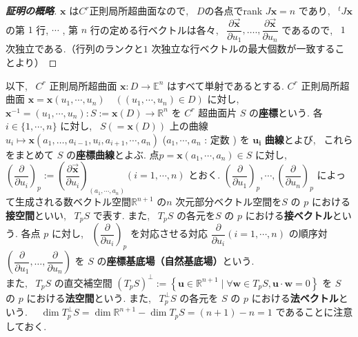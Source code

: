 \documentclass[12pt,a4j,final]{jreport}
\theoremstyle{definition}
\begin{document}
\begin{proof}[\textbf{証明の概略}]
$\boldsymbol{x}$ は$C^r$正則局所超曲面なので, \ $D$の各点でrank $J \boldsymbol{x} = n$ であり, \ ${}^t J \boldsymbol{x}$ の第 $1$ 行, $\cdots$ , 第 $n$ 行の定める行ベクトルは各々, \ $\dfrac{\partial \vec{\boldsymbol{x}}}{\partial u_{1}}, \ldots ., \dfrac{\partial \vec{\boldsymbol{x}}}{\partial u_{n}}$ であるので, \ $1$次独立である.（行列のランクと$1$ 次独立な行ベクトルの最大個数が一致することより）
\end{proof}

\bigskip

以下, \ $C^r$ 正則局所超曲面 $\boldsymbol{x}: D \rightarrow \mathbb{E}^{n}$ はすべて単射であるとする.
$C^{r}$ 正則局所超曲面 $\boldsymbol{x}= \boldsymbol{x} \left(u_{1}, \cdots, u_{n}\right) \quad ((u_{1}, \cdots, u_{n}) \in D )$ に対し,
$\boldsymbol{x}^{-1}=\left(u_{1}, \cdots, u_{n}\right): S:=\boldsymbol{x}(D) \rightarrow \mathbb{R}^{n}$ を $C^{r}$ 超曲面片 $S$ の\textbf{座標}という.
各 $i \in\{1, \cdots, n\}$ に対し, \ $S(= \boldsymbol{x}(D))$ 上の曲線 $u_{i} \mapsto \boldsymbol{x}\left(a_{1}, \ldots, a_{i-1}, u_{i}, a_{i+1}, \cdots, a_{n}\right)$
($a_{1}, \cdots, a_{n}$ : 定数 ) を $\boldsymbol{u_{i}}$ \textbf{曲線}とよび, \ これらをまとめて $S$ の\textbf{座標曲線}とよぶ.
点$p = \boldsymbol{x} (a_{1}, \cdots, a_{n}) \in S$ に対し, 
$\left(\dfrac{\partial}{\partial u_{i}}\right)_{p}:=\left(\dfrac{\partial \vec{\boldsymbol{x}}}{\partial u_{i}}\right)_{\left(a_1, \cdots, a_{n}\right)}(i=1, \cdots, n)$ とおく.
$\left(\dfrac{\partial}{\partial u_{1}}\right)_{p}, \cdots,\left(\dfrac{\partial}{\partial u_{n}}\right)_{p}$ によって生成される数ベクトル空間$\mathbb{R}^{n+1}$ の$n$ 次元部分ベクトル空間を$S$ の $p$ における\textbf{接空間}といい, \ $T_p S$ で表す. また, \ $T_p S$ の各元を$S$ の $p$ における\textbf{接ベクトル}という.
各点 $p$ に対し, \ $\left(\dfrac{\partial}{\partial u_{i}}\right)_{p}$ を対応させる対応 $\dfrac{\partial}{\partial u_{i}}(i=1 , \cdots, n)$ の順序対 $\left(\dfrac{\partial}{\partial u_{1}}, \ldots, \dfrac{\partial}{\partial u_{n}}\right)$ を $S$ の\textbf{座標基底場（自然基底場）}という.\\
また, \ $T_p S$ の直交補空間 $\left(T_{p} S\right)^{\perp}:=\left\{\boldsymbol{u} \in \mathbb{R}^{n+1} \mid \forall \boldsymbol{w} \in T_{p} S, \boldsymbol{u} \cdot \boldsymbol{w} =0\right\}$ を $S$ の $p$ における\textbf{法空間}という. また, \ $T_{p}^{\perp} S$ の各元を $S$ の $p$ における\textbf{法ベクトル}という.
$\quad \operatorname{dim} T_{p}^{\perp} S=\operatorname{dim} \mathbb{R}^{n+1}-\operatorname{dim} T_{p} S=(n+1)-n=1$ であることに注意しておく.
\end{document}
